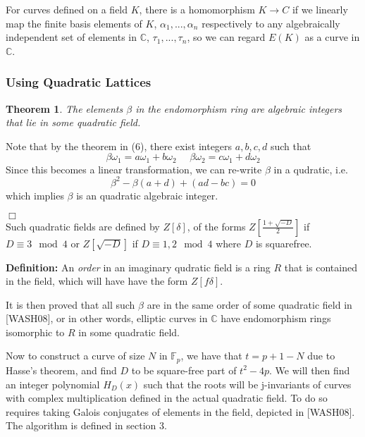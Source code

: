 \documentclass[12pt,twoside]{article}
\newenvironment{proof}{\noindent{\bf Proof:} \hspace*{1mm}}{
	\hspace*{\fill} $\Box$ }
\newtheorem{theorem}{Theorem}
\begin{document}
For curves defined on a field $K$, there is a homomorphism $K \rightarrow C$ if we linearly map the finite basis elements of $K$, $\alpha_{1}, ...,\alpha_{n}$ respectively to any algebraically independent set of elements in $\mathbb{C}$, $\tau_{1},..., \tau_{n}$, so we can regard $E(K)$ as a curve in $\mathbb{C}$.  

\subsubsection{Using Quadratic Lattices}
\begin{theorem}
The elements $\beta$ in the endomorphism ring are algebraic integers that lie in some quadratic field.
\end{theorem}
\begin{proof}
Note that by the theorem in (6), there exist integers $a,b,c,d$ such that 
\begin{equation}
\beta \omega_{1} = a\omega_{1} + b \omega_{2} \> \> \> \> \> \> \beta \omega_{2} = c\omega_{1} + d \omega_{2}
\end{equation}
Since this becomes a linear transformation, we can re-write $\beta$ in a qudratic, i.e. 
\begin{equation}
\beta^{2} -  \beta(a+d) + (ad-bc) = 0
\end{equation}
which implies $\beta$ is an quadratic algebraic integer. 
\end{proof}
\\


Such quadratic fields are defined by $Z[\delta]$, of the forms $Z[\frac{1 + \sqrt{-D}}{2}]$ if $D \equiv 3 \mod 4$  or $Z[\sqrt{-D}]$ if $D \equiv 1,2 \mod 4$ where $D$ is squarefree.


\textbf{Definition:} An \textit{order} in an imaginary qudratic field is a ring $R$ that is contained in the field, which will have have the form $Z[f\delta]$.

It is then proved that all such $\beta$ are in the same order of some quadratic field in [WASH08], or in other words, elliptic curves in $\mathbb{C}$ have endomorphism rings isomorphic to $R$ in some quadratic field.  

Now to construct a curve of size $N$ in $\mathbb{F}_{p}$, we have that $t = p+1 - N$ due to Hasse's theorem, and find $D$ to be square-free part of  $t^{2} -4p$. We will then find an integer polynomial $H_{D}(x)$ such that the roots will be j-invariants of curves with complex multiplication defined in the actual quadratic field. To do so requires taking Galois conjugates of elements in the field, depicted in [WASH08]. The algorithm is defined in section 3. 




 

\end{document}
